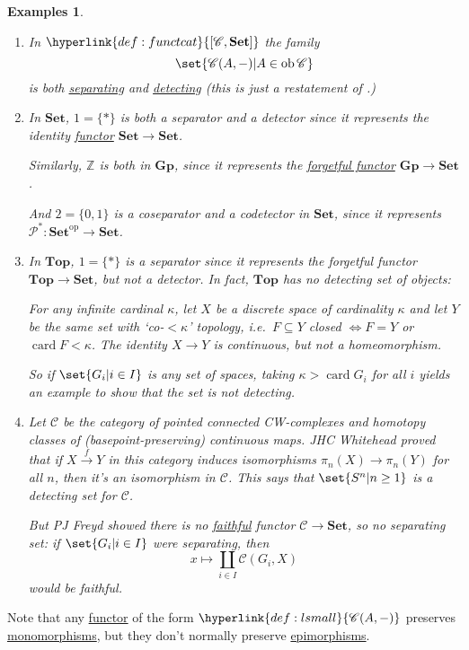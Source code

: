 \documentclass{article}
\DeclareMathOperator{\ob}{ob}
\let\to\longrightarrow
\let\mapsto\longmapsto
\newtheorem{nexample}[nthm]{Examples}
\begin{document}
\begin{nexample}\label{eg:2.10}\leavevmode
  \begin{enumerate}[label=(\alph*)]
    \item In $\hyperlink{def:functcat}{[\mathscr{C}, \mathbf{Set}]}$ the family
      \begin{equation*}
        \set{\mathscr{C}(A, -) | A \in \ob \mathscr{C}}
      \end{equation*}
      is both \hyperlink{def:separating}{separating} and \hyperlink{def:detecting}{detecting} (this is just a restatement of .)
    \item In $\mathbf{Set}$, $1 = \{*\}$ is both a separator and a detector since it represents the identity \hyperlink{def:funct}{functor} $\mathbf{Set} \to \mathbf{Set}$.

      Similarly, $\mathbb{Z}$ is both in $\mathbf{Gp}$, since it represents the \hyperlink{def:forgFunc}{forgetful functor} $\mathbf{Gp} \to \mathbf{Set}$.

      And $2 = \{0,1\}$ is a coseparator and a codetector in $\mathbf{Set}$, since it represents $\mathcal{P}^*: \mathbf{Set}^\text{op} \to \mathbf{Set}$.
    \item In $\mathbf{Top}$, $1 = \{*\}$ is a separator since it represents the forgetful functor $\mathbf{Top} \to \mathbf{Set}$, but not a detector.
      In fact, $\mathbf{Top}$ has no detecting \emph{set} of objects:

      For any infinite cardinal $\kappa$, let $X$ be a discrete space of cardinality $\kappa$ and let $Y$ be the same set with `co-$< \kappa$' topology, i.e.\ $F \subseteq Y$ closed $\iff F = Y$ or $\operatorname{card} F < \kappa$.
      The identity $X \to Y$ is continuous, but not a homeomorphism.

      So if $\set{G_i | i \in I}$ is any set of spaces, taking $\kappa > \operatorname{card} G_i$ for all $i$ yields an example to show that the set is not detecting.
    \item Let $\mathscr{C}$ be the category of pointed connected CW-complexes and homotopy classes of (basepoint-preserving) continuous maps.
      JHC Whitehead proved that if $X \overset{f}\to Y$ in this category induces isomorphisms $\pi_n(X) \to \pi_n(Y)$ for all $n$, then it's an isomorphism in $\mathscr{C}$.
      This says that $\set{S^n | n \geq 1}$ is a detecting set for $\mathscr{C}$.

      But PJ Freyd showed there is no \hyperlink{def:full}{faithful} functor $\mathscr{C} \to \mathbf{Set}$, so no separating \emph{set}: if $\set{G_i | i \in I}$ were separating, then
      \begin{equation*}
        x \mapsto \coprod_{i \in I} \mathscr{C}(G_i, X)
      \end{equation*}
      would be faithful.
  \end{enumerate}
\end{nexample}
Note that any \hyperlink{def:funct}{functor} of the form $\hyperlink{def:lsmall}{\mathscr{C}(A, -)}$ preserves \hyperlink{def:monic}{monomorphisms}, but they don't normally preserve \hyperlink{def:epic}{epimorphisms}.
\end{document}
